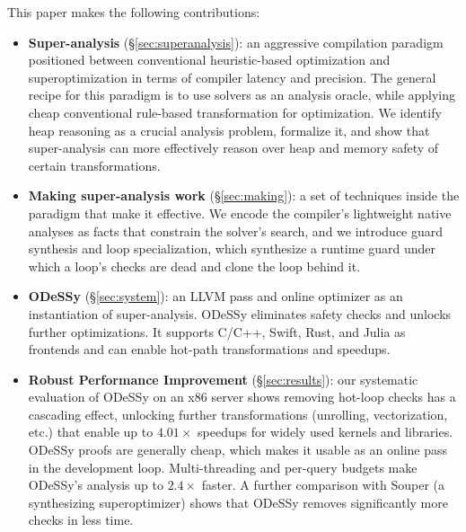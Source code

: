 \documentclass[acmsmall,screen,nonacm]{acmart}
\newcommand{\odessy}{ODeSSy}
\newcommand{\tool}{\odessy}
\begin{document}
This paper makes the following contributions:
\begin{itemize}
\item \textbf{Super-analysis} (\S\ref{sec:superanalysis}): an aggressive compilation paradigm
  positioned between conventional heuristic-based optimization and superoptimization in terms of compiler latency and precision. The general recipe for this paradigm is to use solvers as an analysis oracle, while applying cheap conventional rule-based transformation for optimization. We identify heap reasoning as
  a crucial analysis problem, formalize it, and show that
  super-analysis can more effectively reason over heap and memory safety
  of certain transformations.
\item \textbf{Making super-analysis work} (\S\ref{sec:making}): a set of
  techniques inside the paradigm that make it effective. We encode the
  compiler's lightweight native analyses as facts that constrain the
  solver's search, and we
  introduce guard synthesis and loop specialization, which synthesize a
  runtime guard under which a loop's checks are dead and clone the loop
  behind it.
\item \textbf{\tool{}} (\S\ref{sec:system}): an LLVM pass and online optimizer
  as an instantiation of super-analysis. \tool{} eliminates safety checks and unlocks further optimizations. It supports C/C++, Swift, Rust, and Julia as frontends and can enable hot-path transformations and speedups.
\item \textbf{Robust Performance Improvement} (\S\ref{sec:results}):
  our systematic evaluation of \tool{} on an x86 server shows removing hot-loop checks has a cascading effect, unlocking further transformations (unrolling, vectorization, etc.) that enable up to $4.01\times$ speedups for widely used kernels and libraries. \tool{} proofs are generally cheap, which makes it usable as an online pass in the development loop. Multi-threading and per-query budgets make \tool{}'s analysis up to $2.4\times$ faster. A further comparison with Souper (a synthesizing superoptimizer) shows that \tool{} removes significantly more checks in less time.
\end{itemize}
\end{document}
